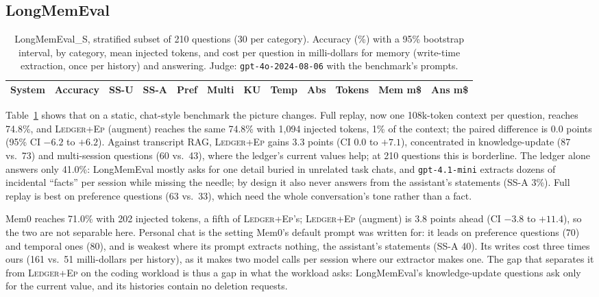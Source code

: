 \documentclass[10pt,conference]{IEEEtran}
\newcommand{\hyb}{\textsc{Ledger+Ep}}
\begin{document}
\subsection{LongMemEval}

\begin{table}[t]
\caption{LongMemEval\_S, stratified subset of 210 questions (30 per category).
Accuracy (\%) with a 95\% bootstrap interval, by category, mean injected tokens,
and cost per question in milli-dollars for memory (write-time extraction, once per
history) and answering. Judge: \texttt{gpt-4o-2024-08-06} with the benchmark's prompts.}
\label{tab:lme}
\centering
\footnotesize
\begin{tabular}{@{}lc ccccccc rrr@{}}
\toprule
System & Accuracy & SS-U & SS-A & Pref & Multi & KU & Temp & Abs & Tokens & Mem m\$ & Ans m\$ \\
\midrule

\bottomrule
\end{tabular}
\end{table}

Table~\ref{tab:lme} shows that on a static, chat-style benchmark the picture
changes. Full replay, now one 108k-token context per question, reaches 74.8\%,
and \hyb{} (augment) reaches the same 74.8\% with 1{,}094 injected tokens, 1\% of
the context; the paired difference is 0.0 points (95\% CI $-6.2$ to $+6.2$). Against
transcript RAG, \hyb{} gains 3.3 points (CI $0.0$ to $+7.1$), concentrated in
knowledge-update (87 vs.\ 73) and multi-session questions (60 vs.\ 43), where
the ledger's current values help; at 210 questions this is borderline. The ledger
alone answers only 41.0\%: LongMemEval mostly asks for one detail buried in
unrelated task chats, and \texttt{gpt-4.1-mini} extracts dozens of incidental
``facts'' per session while missing the needle; by design it also never answers
from the assistant's statements (SS-A 3\%). Full replay is best on
preference questions (63 vs.\ 33), which need the whole conversation's tone rather
than a fact.

Mem0 reaches 71.0\% with 202 injected tokens, a fifth of \hyb{}'s; \hyb{}
(augment) is 3.8 points ahead (CI $-3.8$ to $+11.4$), so the two are not
separable here. Personal chat is the setting Mem0's default prompt was written
for: it leads on preference questions (70) and temporal ones (80), and is
weakest where its prompt extracts nothing, the assistant's statements (SS-A 40).
Its writes cost three times ours (161 vs.\ 51 milli-dollars per history), as it
makes two model calls per session where our extractor makes one. The gap that
separates it from \hyb{} on the coding workload is thus a gap in what the
workload asks: LongMemEval's knowledge-update questions ask only for the
current value, and its histories contain no deletion requests.
\end{document}
